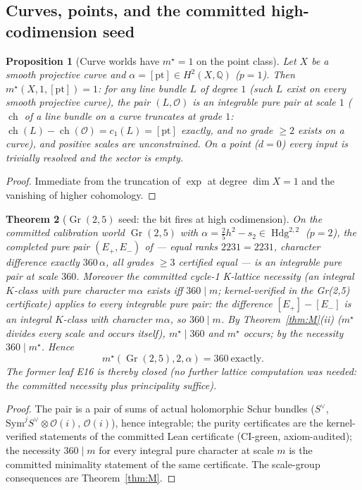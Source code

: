 \documentclass[11pt]{article}
\newtheorem{theorem}{Theorem}[section]
\newtheorem{proposition}[theorem]{Proposition}
\newcommand{\ch}{\operatorname{ch}}
\newcommand{\Oo}{\mathcal{O}}
\newcommand{\tensor}{\otimes}
\newcommand{\Hdg}{\operatorname{Hdg}}
\newcommand{\Q}{\mathbb{Q}}
\newcommand{\Gr}{\operatorname{Gr}}
\begin{document}
\subsection{Curves, points, and the committed high-codimension seed}

\begin{proposition}[Curve worlds have $m^\star=1$ on the point class]
\label{prop:curve}
Let $X$ be a smooth projective curve and $\alpha=[\mathrm{pt}]\in H^2(X,\Q)$
($p=1$).  Then $m^\star(X,1,[\mathrm{pt}])=1$: for any line bundle $L$ of
degree $1$ (such $L$ exist on every smooth projective curve), the pair
$(L,\Oo)$ is an integrable pure pair at scale $1$ ($\ch$ of a line bundle on
a curve truncates at grade $1$: $\ch(L)-\ch(\Oo)=c_1(L)=[\mathrm{pt}]$
exactly, and no grade $\ge2$ exists on a curve), and positive scales are
unconstrained.
On a point ($d=0$) every input is trivially resolved and the sector is
empty.
\end{proposition}

\begin{proof}
Immediate from the truncation of $\exp$ at degree $\dim X=1$ and the
vanishing of higher cohomology.
\end{proof}

\begin{theorem}[$\Gr(2,5)$ seed: the bit fires at high codimension]
\label{thm:grseed}
On the committed calibration world $\Gr(2,5)$ with
$\alpha=\frac25h^2-s_2\in\Hdg^{2,2}$ ($p=2$), the completed pure pair
$(E_+,E_-)$ of \cite{GST-gr25} --- equal ranks $2231=2231$, character
difference exactly $360\,\alpha$, all grades $\ge3$ certified equal ---
is an integrable pure pair at scale $360$.  Moreover the committed cycle-1
K-lattice \emph{necessity} (an integral $K$-class with pure character
$m\alpha$ exists iff $360\mid m$; kernel-verified in the Gr(2,5)
certificate) applies to every integrable pure pair: the difference
$[E_+]-[E_-]$ is an integral $K$-class with character $m\alpha$, so
$360\mid m$.  By Theorem~\ref{thm:M}(ii) ($m^\star$ divides every scale
and occurs itself), $m^\star\mid 360$ and $m^\star$ occurs; by the
necessity $360\mid m^\star$.  Hence
\[
\boxed{\;m^\star(\Gr(2,5),2,\alpha)=360\ \text{exactly}.\;}
\]
The former leaf E16 is thereby \emph{closed} (no further lattice computation
was needed: the committed necessity plus principality suffice).
\end{theorem}

\begin{proof}
The pair is a pair of sums of actual holomorphic Schur bundles
($S^\vee$, $\mathrm{Sym}^jS^\vee\tensor\Oo(i)$, $\Oo(i)$), hence integrable;
the purity certificates are the kernel-verified statements of the committed
Lean certificate \cite{GST-gr25} (CI-green, axiom-audited); the necessity
$360\mid m$ for every integral pure character at scale $m$ is the committed
minimality statement of the same certificate.  The scale-group consequences
are Theorem~\ref{thm:M}.
\end{proof}
\end{document}
